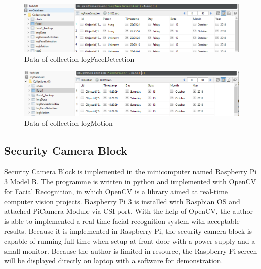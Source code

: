     \begin{figure}[!ht]
        \begin{center}
        \includegraphics[scale=0.55]{images/logFace.png}
        \caption{Data of collection logFaceDetection}
        \label{fig:logFace}
        \end{center}
    \end{figure}
    \begin{figure}[!ht]
        \begin{center}
        \includegraphics[scale=0.55]{images/logMotion.png}
        \caption{Data of collection logMotion}
        \label{fig:logMotion}
        \end{center}
    \end{figure}
 
    \subsection{Security Camera Block}
    Security Camera Block is implemented in the minicomputer named Raspberry Pi 3 Model B. The programme is written in python and implemented with OpenCV for Facial Recognition, in which OpenCV is a library aimed at real-time computer vision projects. Raspberry Pi 3 is installed with Raspbian OS and attached PiCamera Module via CSI port. With the help of OpenCV, the author is able to implemented a real-time facial recognition system with acceptable results. Because it is implemented in Raspberry Pi, the security camera block is capable of running full time when setup at front door with a power supply and a small monitor. Because the author is limited in resource, the Raspberry Pi screen will be displayed directly on laptop with a software for demonstration.

